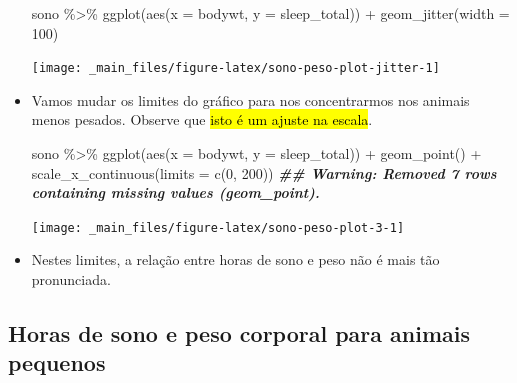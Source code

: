 \documentclass[
  11pt]{report}
\newenvironment{Shaded}{\begin{snugshade}}{\end{snugshade}}
\newcommand{\AttributeTok}[1]{\textcolor[rgb]{0.77,0.63,0.00}{#1}}
\newcommand{\DecValTok}[1]{\textcolor[rgb]{0.00,0.00,0.81}{#1}}
\newcommand{\DocumentationTok}[1]{\textcolor[rgb]{0.56,0.35,0.01}{\textbf{\textit{#1}}}}
\newcommand{\FunctionTok}[1]{\textcolor[rgb]{0.00,0.00,0.00}{#1}}
\newcommand{\NormalTok}[1]{#1}
\newcommand{\SpecialCharTok}[1]{\textcolor[rgb]{0.00,0.00,0.00}{#1}}
\begin{document}
\begin{itemize}
\begin{Shaded}
\begin{Highlighting}[]
\NormalTok{sono }\SpecialCharTok{\%\textgreater{}\%} 
  \FunctionTok{ggplot}\NormalTok{(}\FunctionTok{aes}\NormalTok{(}\AttributeTok{x =}\NormalTok{ bodywt, }\AttributeTok{y =}\NormalTok{ sleep\_total)) }\SpecialCharTok{+}
    \FunctionTok{geom\_jitter}\NormalTok{(}\AttributeTok{width =} \DecValTok{100}\NormalTok{)}
\end{Highlighting}
\end{Shaded}

  \begin{center}\texttt{[image: \_main\_files/figure-latex/sono-peso-plot-jitter-1]} \end{center}
\item
  Vamos mudar os limites do gráfico para nos concentrarmos nos animais menos pesados. Observe que {\hl{isto é um ajuste na escala}}.

\begin{Shaded}
\begin{Highlighting}[]
\NormalTok{sono }\SpecialCharTok{\%\textgreater{}\%} 
  \FunctionTok{ggplot}\NormalTok{(}\FunctionTok{aes}\NormalTok{(}\AttributeTok{x =}\NormalTok{ bodywt, }\AttributeTok{y =}\NormalTok{ sleep\_total)) }\SpecialCharTok{+}
    \FunctionTok{geom\_point}\NormalTok{() }\SpecialCharTok{+}
    \FunctionTok{scale\_x\_continuous}\NormalTok{(}\AttributeTok{limits =} \FunctionTok{c}\NormalTok{(}\DecValTok{0}\NormalTok{, }\DecValTok{200}\NormalTok{))}
\DocumentationTok{\#\# Warning: Removed 7 rows containing missing values (geom\_point).}
\end{Highlighting}
\end{Shaded}

  \begin{center}\texttt{[image: \_main\_files/figure-latex/sono-peso-plot-3-1]} \end{center}
\item
  Nestes limites, a relação entre horas de sono e peso não é mais tão pronunciada.
\end{itemize}

\hypertarget{horas-de-sono-e-peso-corporal-para-animais-pequenos}{%
\subsection{Horas de sono e peso corporal para animais pequenos}\label{horas-de-sono-e-peso-corporal-para-animais-pequenos}}
\end{document}
